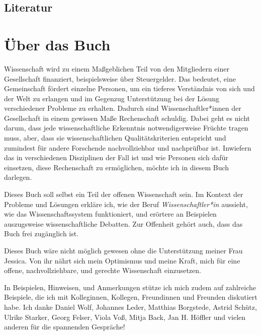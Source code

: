 \documentclass[
  letterpaper,
  DIV=11,
  numbers=noendperiod]{scrreprt}
\begin{document}
\section{Literatur}\label{literatur}


\chapter{Über das Buch}\label{uxfcber-das-buch}

Wissenschaft wird zu einem Maßgeblichen Teil von den Mitgliedern einer
Gesellschaft finanziert, beispielsweise über Steuergelder. Das bedeutet,
eine Gemeinschaft fördert einzelne Personen, um ein tieferes Verständnis
von sich und der Welt zu erlangen und im Gegenzug Unterstützung bei der
Lösung verschiedener Probleme zu erhalten. Dadurch sind
Wissenschaftler*innen der Gesellschaft in einem gewissen Maße
Rechenschaft schuldig. Dabei geht es nicht darum, dass jede
wissenschaftliche Erkenntnis notwendigerweise Früchte tragen muss, aber,
dass sie wissenschaftlichen Qualitätskriterien entspricht und zumindest
für andere Forschende nachvollziehbar und nachprüfbar ist. Inwiefern das
in verschiedenen Disziplinen der Fall ist und wie Personen sich dafür
einsetzen, diese Rechenschaft zu ermöglichen, möchte ich in diesem Buch
darlegen.

Dieses Buch soll selbst ein Teil der offenen Wissenschaft sein. Im
Kontext der Probleme und Lösungen erkläre ich, wie der Beruf
\emph{Wissenschaftler*in} aussieht, wie das Wissenschaftssystem
funktioniert, und erörtere an Beispielen auszugsweise wissenschaftliche
Debatten. Zur Offenheit gehört auch, dass das Buch frei zugänglich ist.

\begin{tcolorbox}[enhanced jigsaw, left=2mm, colback=white, colframe=quarto-callout-note-color-frame, opacitybacktitle=0.6, opacityback=0, title=\textcolor{quarto-callout-note-color}{\faInfo}\hspace{0.5em}{Danksagungen}, toptitle=1mm, coltitle=black, colbacktitle=quarto-callout-note-color!10!white, titlerule=0mm, bottomtitle=1mm, leftrule=.75mm, breakable, rightrule=.15mm, bottomrule=.15mm, toprule=.15mm, arc=.35mm]

Dieses Buch wäre nicht möglich gewesen ohne die Unterstützung meiner
Frau Jessica. Von ihr nährt sich mein Optimismus und meine Kraft, mich
für eine offene, nachvollziehbare, und gerechte Wissenschaft
einzusetzen.

In Beispielen, Hinweisen, und Anmerkungen stütze ich mich zudem auf
zahlreiche Beispiele, die ich mit Kolleginnen, Kollegen, Freundinnen und
Freunden diskutiert habe. Ich danke Daniel Wolf, Johannes Leder,
Matthias Borgstede, Astrid Schütz, Ulrike Starker, Georg Felser, Viola
Voß, Mitja Back, Jan H. Höffler und vielen anderen für die spannenden
Gespräche!

\end{tcolorbox}
\end{document}
